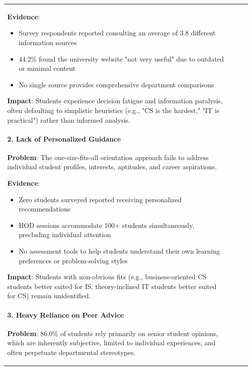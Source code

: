 \documentclass[12pt, a4paper]{article}
\begin{document}
\begin{itemize}[leftmargin=1.5em, itemsep=3pt]
\begin{table}[H]
\begin{tabularx}{\textwidth}{>{\raggedright\arraybackslash}p{0.8cm}>{\raggedright\arraybackslash}p{3.5cm}>{\raggedright\arraybackslash}X>{\raggedright\arraybackslash}p{2.5cm}}
\textbf{Evidence}:
\begin{itemize}[leftmargin=1.5em, itemsep=2pt]
    \item Survey respondents reported consulting an average of 3.8 different information sources
    \item 44.2\% found the university website "not very useful" due to outdated or minimal content
    \item No single source provides comprehensive department comparisons
\end{itemize}

\textbf{Impact}: Students experience decision fatigue and information paralysis, often defaulting to simplistic heuristics (e.g., "CS is the hardest," "IT is practical") rather than informed analysis.

\paragraph{2. Lack of Personalized Guidance}

\textbf{Problem}: The one-size-fits-all orientation approach fails to address individual student profiles, interests, aptitudes, and career aspirations.

\textbf{Evidence}:
\begin{itemize}[leftmargin=1.5em, itemsep=2pt]
    \item Zero students surveyed reported receiving personalized recommendations
    \item HOD sessions accommodate 100+ students simultaneously, precluding individual attention
    \item No assessment tools to help students understand their own learning preferences or problem-solving styles
\end{itemize}

\textbf{Impact}: Students with non-obvious fits (e.g., business-oriented CS students better suited for IS, theory-inclined IT students better suited for CS) remain unidentified.

\paragraph{3. Heavy Reliance on Peer Advice}

\textbf{Problem}: 86.0\% of students rely primarily on senior student opinions, which are inherently subjective, limited to individual experiences, and often perpetuate departmental stereotypes.


\end{tabularx}
\end{table}
\end{itemize}
\end{document}
